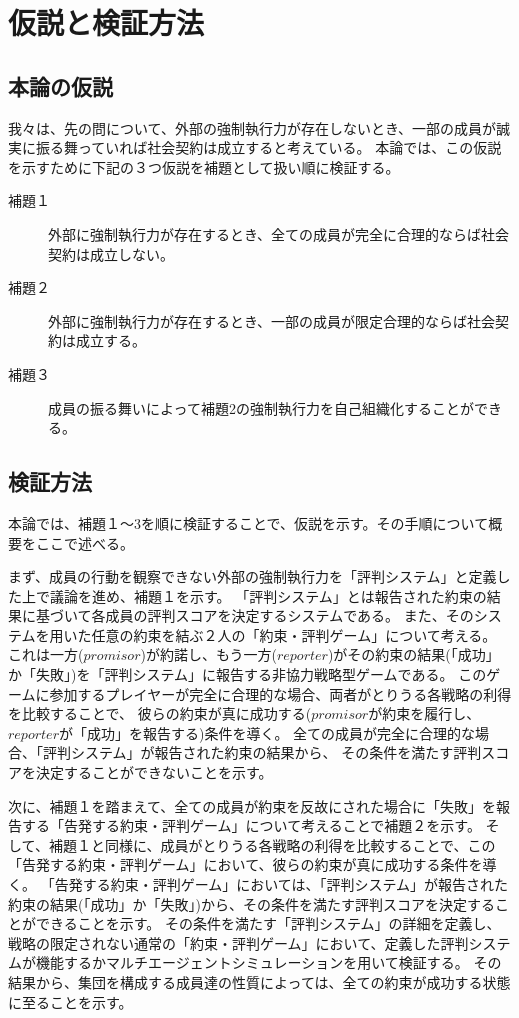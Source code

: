 
\chapter{仮説と検証方法}
\section{本論の仮説}
\label{hypothesis}
我々は、先の問について、外部の強制執行力が存在しないとき、一部の成員が誠実に振る舞っていれば社会契約は成立すると考えている。
本論では、この仮説を示すために下記の３つ仮説を補題として扱い順に検証する。

\def\firstLemma{外部に強制執行力が存在するとき、全ての成員が完全に合理的ならば社会契約は成立しない。}
\def\secondLemma{外部に強制執行力が存在するとき、一部の成員が限定合理的ならば社会契約は成立する。}
\def\thirdLemma{成員の振る舞いによって補題2の強制執行力を自己組織化することができる。}

\begin{description}
  \item[補題１] \firstLemma
  \item[補題２] \secondLemma
  \item[補題３] \thirdLemma
\end{description}

\section{検証方法}
本論では、補題１〜3を順に検証することで、仮説を示す。その手順について概要をここで述べる。

まず、成員の行動を観察できない外部の強制執行力を「評判システム」と定義した上で議論を進め、補題１を示す。
「評判システム」とは報告された約束の結果に基づいて各成員の評判スコアを決定するシステムである。
また、そのシステムを用いた任意の約束を結ぶ２人の「約束・評判ゲーム」について考える。
これは一方($promisor$)が約諾し、もう一方($reporter$)がその約束の結果(「成功」か「失敗」)を「評判システム」に報告する非協力戦略型ゲームである。
このゲームに参加するプレイヤーが完全に合理的な場合、両者がとりうる各戦略の利得を比較することで、
彼らの約束が真に成功する($promisor$が約束を履行し、$reporter$が「成功」を報告する)条件を導く。
全ての成員が完全に合理的な場合、「評判システム」が報告された約束の結果から、
その条件を満たす評判スコアを決定することができないことを示す。

次に、補題１を踏まえて、全ての成員が約束を反故にされた場合に「失敗」を報告する「告発する約束・評判ゲーム」について考えることで補題２を示す。
そして、補題１と同様に、成員がとりうる各戦略の利得を比較することで、この「告発する約束・評判ゲーム」において、彼らの約束が真に成功する条件を導く。
「告発する約束・評判ゲーム」においては、「評判システム」が報告された約束の結果(「成功」か「失敗」)から、その条件を満たす評判スコアを決定することができることを示す。
その条件を満たす「評判システム」の詳細を定義し、
戦略の限定されない通常の「約束・評判ゲーム」において、定義した評判システムが機能するかマルチエージェントシミュレーションを用いて検証する。
その結果から、集団を構成する成員達の性質によっては、全ての約束が成功する状態に至ることを示す。

